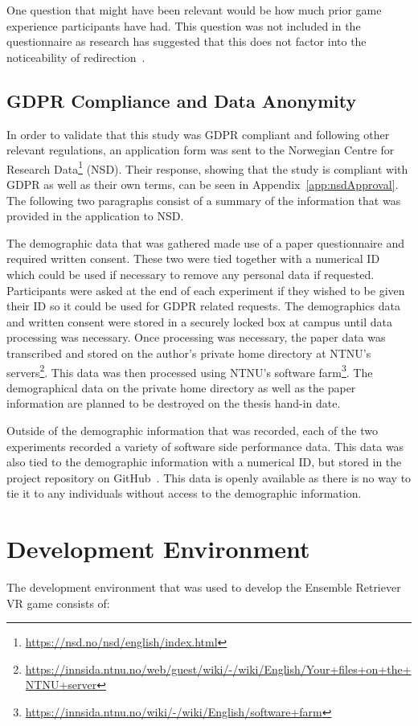 One question that might have been relevant would be how much prior game experience participants have had. This question was not included in the questionnaire as research has suggested that this does not factor into the noticeability of redirection~\cite{nguyen2018individual}.

\subsection{GDPR Compliance and Data Anonymity}
In order to validate that this study was GDPR compliant and following other relevant regulations, an application form was sent to the Norwegian Centre for Research Data\footnote{\url{https://nsd.no/nsd/english/index.html}} (NSD). Their response, showing that the study is compliant with GDPR as well as their own terms, can be seen in Appendix~\ref{app:nsdApproval}. The following two paragraphs consist of a summary of the information that was provided in the application to NSD.

The demographic data that was gathered made use of a paper questionnaire and required written consent. These two were tied together with a numerical ID which could be used if necessary to remove any personal data if requested. Participants were asked at the end of each experiment if they wished to be given their ID so it could be used for GDPR related requests. The demographics data and written consent were stored in a securely locked box at campus until data processing was necessary. Once processing was necessary, the paper data was transcribed and stored on the author's private home directory at NTNU's servers\footnote{\url{https://innsida.ntnu.no/web/guest/wiki/-/wiki/English/Your+files+on+the+NTNU+server}}. This data was then processed using NTNU's software farm\footnote{\url{https://innsida.ntnu.no/wiki/-/wiki/English/software+farm}}. The demographical data on the private home directory as well as the paper information are planned to be destroyed on the thesis hand-in date.

Outside of the demographic information that was recorded, each of the two experiments recorded a variety of software side performance data. This data was also tied to the demographic information with a numerical ID, but stored in the project repository on GitHub~\cite{projectRepository}. This data is openly available as there is no way to tie it to any individuals without access to the demographic information.

\section{Development Environment}
The development environment that was used to develop the Ensemble Retriever VR game consists of: 

